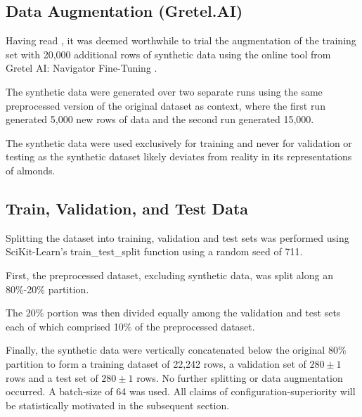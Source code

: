 
\subsection{Data Augmentation (Gretel.AI)}

Having read \cite{sun2017revisitingunreasonableeffectivenessdata}, 
it was deemed worthwhile to trial the augmentation of the training set with 20,000 additional rows of synthetic data using 
the online tool from Gretel AI: Navigator Fine-Tuning \cite{Gretel.ai}. 

The synthetic data were generated over two separate runs using the same preprocessed version of 
the original dataset as context, where the first run generated 5,000 new rows of data 
and the second run generated 15,000. 

The synthetic data were used exclusively for training and never for validation or testing as the synthetic dataset likely
deviates from reality in its representations of almonds. 

\subsection{Train, Validation, and Test Data}

Splitting the dataset into training, validation and test sets was performed using
SciKit-Learn's train\_test\_split function using a random seed of 711.

First, the preprocessed dataset, excluding synthetic data, was split along an 80\%-20\% partition.

The 20\% portion was then divided equally among the validation and test sets each of which comprised 
10\% of the preprocessed dataset. 

Finally, the synthetic data were vertically concatenated below the original 80\% partition
to form a training dataset of 22,242 rows, a validation set of $280\pm1$ rows and a test set 
of $280\pm1$ rows. No further splitting or data augmentation occurred. A batch-size of 64 was used.
All claims of configuration-superiority will be statistically motivated in the subsequent section.